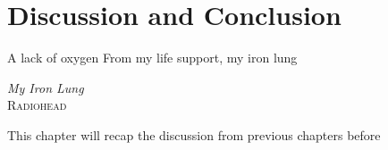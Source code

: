\chapter{Discussion and Conclusion} \label{sec:discussion_and_conclusion}
    \vspace*{\fill}
    \setlength{\epigraphwidth}{0.4\linewidth}
    \renewcommand{\epigraphflush}{flushright}
    \renewcommand{\epigraphsize}{\footnotesize}
    \epigraph{A lack of oxygen\newline
              From my life support, my iron lung}%
              {\textit{My Iron Lung}\\ \textsc{Radiohead}}
    
    \newpage
    
        This chapter will recap the discussion from previous chapters before 
